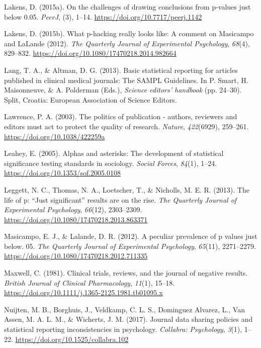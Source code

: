 \documentclass[
  12pt,
]{article}
\begin{document}
\leavevmode\hypertarget{ref-Lakens2015a}{}%
Lakens, D. (2015a). On the challenges of drawing conclusions from
p-values just below 0.05. \emph{PeerJ}, (3), 1--14.
\url{https://doi.org/10.7717/peerj.1142}

\leavevmode\hypertarget{ref-Lakens2015b}{}%
Lakens, D. (2015b). What p-hacking really looks like: A comment on
Masicampo and LaLande (2012). \emph{The Quarterly Journal of
Experimental Psychology}, \emph{68}(4), 829--832.
\url{https://doi.org/10.1080/17470218.2014.982664}

\leavevmode\hypertarget{ref-Lang}{}%
Lang, T. A., \& Altman, D. G. (2013). Basic statistical reporting for
articles published in clinical medical journals: The SAMPL Guidelines.
In P. Smart, H. Maisonneuve, \& A. Polderman (Eds.), \emph{Science
editors' handbook} (pp. 24--30). Split, Croatia: European Association of
Science Editors.

\leavevmode\hypertarget{ref-Lawrence}{}%
Lawrence, P. A. (2003). The politics of publication - authors, reviewers
and editors must act to protect the quality of research. \emph{Nature},
\emph{422}(6929), 259--261. \url{https://doi.org/10.1038/422259a}

\leavevmode\hypertarget{ref-Leahey}{}%
Leahey, E. (2005). Alphas and asterisks: The development of statistical
significance testing standards in sociology. \emph{Social Forces},
\emph{84}(1), 1--24. \url{https://doi.org/10.1353/sof.2005.0108}

\leavevmode\hypertarget{ref-Leggett}{}%
Leggett, N. C., Thomas, N. A., Loetscher, T., \& Nicholls, M. E. R.
(2013). The life of p: ``Just significant'' results are on the rise.
\emph{The Quarterly Journal of Experimental Psychology}, \emph{66}(12),
2303--2309. \url{https://doi.org/10.1080/17470218.2013.863371}

\leavevmode\hypertarget{ref-Masicampo}{}%
Masicampo, E. J., \& Lalande, D. R. (2012). A peculiar prevalence of p
values just below. 05. \emph{The Quarterly Journal of Experimental
Psychology}, \emph{65}(11), 2271--2279.
\url{https://doi.org/10.1080/17470218.2012.711335}

\leavevmode\hypertarget{ref-Maxwell}{}%
Maxwell, C. (1981). Clinical trials, reviews, and the journal of
negative results. \emph{British Journal of Clinical Pharmacology},
\emph{11}(1), 15--18.
\url{https://doi.org/10.1111/j.1365-2125.1981.tb01095.x}

\leavevmode\hypertarget{ref-Nuijten2017}{}%
Nuijten, M. B., Borghuis, J., Veldkamp, C. L. S., Dominguez Alvarez, L.,
Van Assen, M. A. L. M., \& Wicherts, J. M. (2017). Journal data sharing
policies and statistical reporting inconsistencies in psychology.
\emph{Collabra: Psychology}, \emph{3}(1), 1--22.
\url{https://doi.org/10.1525/collabra.102}
\end{document}
